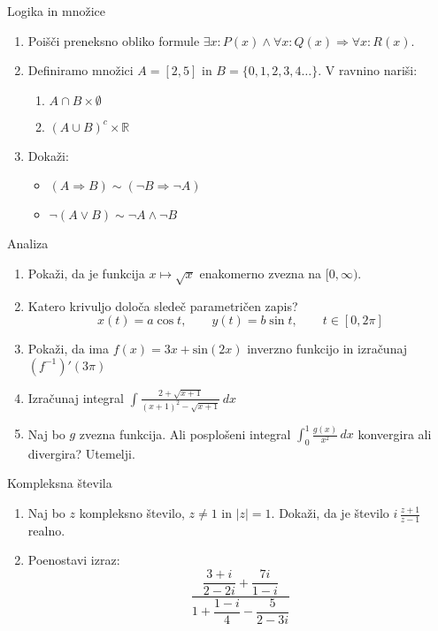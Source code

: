 \begin{frame}{Logika in množice}
	\begin{enumerate}
		\item
		Poišči preneksno obliko formule $\exists x: P(x) \land \forall x: Q(x) \Rightarrow \forall x: R(x)$.
		\item 
		Definiramo množici $A = [2,5]$ in $B = \{0,1,2,3,4\dots\}$.
		V ravnino nariši:
		\begin{enumerate}
		   \item $A \cap B \times \emptyset$
		   \item $(A \cup B)^c \times \mathbb{R}$
		\end{enumerate}
		\item
		Dokaži:
		\begin{itemize}
			\item $(A \Rightarrow B) \sim (\lnot B \Rightarrow \lnot A)$
			\item $\lnot(A \lor B) \sim \lnot A \land \lnot B$
		\end{itemize}
	\end{enumerate}
\end{frame}

\begin{frame}{Analiza}
	\begin{enumerate}
		\item
		Pokaži, da je funkcija $x \mapsto \sqrt{x}$ enakomerno zvezna na $[0,\infty )$.
		\item 
		Katero krivuljo določa sledeč parametričen zapis?
		$$
		   x(t) = a \cos t, \qquad 
		   y(t) = b \sin t, \qquad 
		   t \in [0, 2 \pi]
		$$ 
		\item
		Pokaži, da ima $f(x) = 3x + \text{sin}(2x) $ inverzno funkcijo in izračunaj $(f^{-1})'(3\pi) $
		
		\item
		Izračunaj integral 
		$ \displaystyle \int \frac{2+\sqrt{x+1}}{(x+1)^2-\sqrt{x+1}} \,dx $
		\item 
		Naj bo $g$ zvezna funkcija. Ali posplošeni integral 
		$\int_{0}^{1} \frac{g(x)}{x^2} \, dx$
		konvergira ali divergira? Utemelji.
	\end{enumerate}
\end{frame}

\begin{frame}{Kompleksna števila}
	\begin{enumerate}
		\item
		Naj bo $z$ kompleksno število, $z \ne 1$ in $|z| = 1 $.
		Dokaži, da je število \( i \, \frac{z+1}{z-1} \) realno.
		\item
		Poenostavi izraz:
		$$\dfrac{\dfrac{3 + i}{2 - 2i} + \dfrac{7i}{1-i}}{1 + \dfrac{1 - i}{4} - \dfrac{5}{2-3i}}$$

	\end{enumerate}
\end{frame}